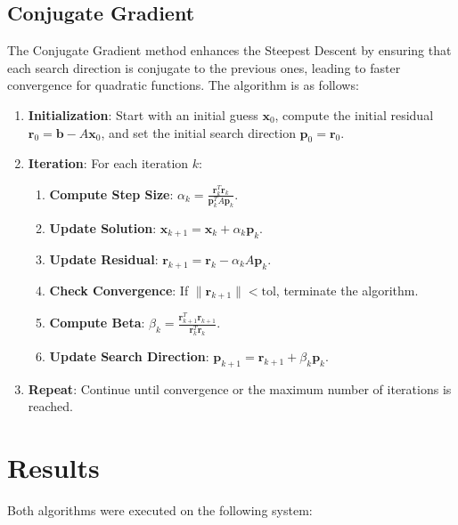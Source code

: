 \documentclass[a4paper, 12pt]{article}
\begin{document}
\subsection*{Conjugate Gradient}

The Conjugate Gradient method enhances the Steepest Descent by ensuring that each search direction is conjugate to the previous ones, leading to faster convergence for quadratic functions. The algorithm is as follows:

\begin{enumerate}
    \item \textbf{Initialization}: Start with an initial guess \( \mathbf{x}_0 \), compute the initial residual \( \mathbf{r}_0 = \mathbf{b} - A\mathbf{x}_0 \), and set the initial search direction \( \mathbf{p}_0 = \mathbf{r}_0 \).
    \item \textbf{Iteration}: For each iteration \( k \):
    \begin{enumerate}[label=\roman*)]
        \item \textbf{Compute Step Size}: \( \alpha_k = \frac{\mathbf{r}_k^T \mathbf{r}_k}{\mathbf{p}_k^T A \mathbf{p}_k} \).
        \item \textbf{Update Solution}: \( \mathbf{x}_{k+1} = \mathbf{x}_k + \alpha_k \mathbf{p}_k \).
        \item \textbf{Update Residual}: \( \mathbf{r}_{k+1} = \mathbf{r}_k - \alpha_k A \mathbf{p}_k \).
        \item \textbf{Check Convergence}: If \( \|\mathbf{r}_{k+1}\| < \text{tol} \), terminate the algorithm.
        \item \textbf{Compute Beta}: \( \beta_k = \frac{\mathbf{r}_{k+1}^T \mathbf{r}_{k+1}}{\mathbf{r}_k^T \mathbf{r}_k} \).
        \item \textbf{Update Search Direction}: \( \mathbf{p}_{k+1} = \mathbf{r}_{k+1} + \beta_k \mathbf{p}_k \).
    \end{enumerate}
    \item \textbf{Repeat}: Continue until convergence or the maximum number of iterations is reached.
\end{enumerate}

\section*{Results}

Both algorithms were executed on the following system:
\end{document}
